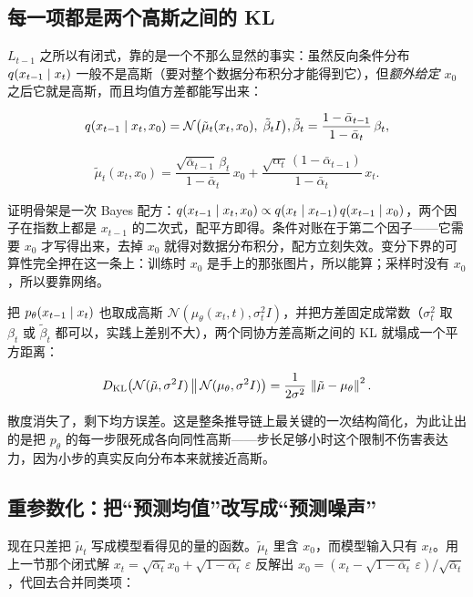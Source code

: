 \subsection{每一项都是两个高斯之间的 KL}

\(L_{t-1}\) 之所以有闭式，靠的是一个不那么显然的事实：虽然反向条件分布 \(q(x_{t-1}\mid x_t)\) 一般不是高斯（要对整个数据分布积分才能得到它），但\emph{额外给定 \(x_0\)} 之后它就是高斯，而且均值方差都能写出来：

\[
q(x_{t-1}\mid x_t,x_0) = \mathcal N\bigl(\tilde\mu_t(x_t,x_0),\;\tilde\beta_t I\bigr),
\space
\tilde\beta_t = \frac{1-\bar\alpha_{t-1}}{1-\bar\alpha_t}\,\beta_t,
\]

\[
\tilde\mu_t(x_t,x_0)
= \frac{\sqrt{\bar\alpha_{t-1}}\,\beta_t}{1-\bar\alpha_t}\,x_0
+ \frac{\sqrt{\alpha_t}\,(1-\bar\alpha_{t-1})}{1-\bar\alpha_t}\,x_t .
\]

证明骨架是一次 Bayes 配方：\(q(x_{t-1}\mid x_t,x_0)\propto q(x_t\mid x_{t-1})\,q(x_{t-1}\mid x_0)\)，两个因子在指数上都是 \(x_{t-1}\) 的二次式，配平方即得。条件对账在于第二个因子——它需要 \(x_0\) 才写得出来，去掉 \(x_0\) 就得对数据分布积分，配方立刻失效。变分下界的可算性完全押在这一条上：训练时 \(x_0\) 是手上的那张图片，所以能算；采样时没有 \(x_0\)，所以要靠网络。

把 \(p_\theta(x_{t-1}\mid x_t)\) 也取成高斯 \(\mathcal N(\mu_\theta(x_t,t),\sigma_t^2 I)\)，并把方差固定成常数（\(\sigma_t^2\) 取 \(\beta_t\) 或 \(\tilde\beta_t\) 都可以，实践上差别不大），两个同协方差高斯之间的 KL 就塌成一个平方距离：

\[
D_{\mathrm{KL}}\bigl(\mathcal N(\tilde\mu,\sigma^2 I)\,\big\|\,\mathcal N(\mu_\theta,\sigma^2 I)\bigr)
= \frac{1}{2\sigma^2}\,\left\lVert\tilde\mu-\mu_\theta\right\rVert^2 .
\]

散度消失了，剩下均方误差。这是整条推导链上最关键的一次结构简化，为此让出的是把 \(p_\theta\) 的每一步限死成各向同性高斯——步长足够小时这个限制不伤害表达力，因为小步的真实反向分布本来就接近高斯。

\subsection{重参数化：把``预测均值''改写成``预测噪声''}

现在只差把 \(\tilde\mu_t\) 写成模型看得见的量的函数。\(\tilde\mu_t\) 里含 \(x_0\)，而模型输入只有 \(x_t\)。用上一节那个闭式解 \(x_t=\sqrt{\bar\alpha_t}x_0+\sqrt{1-\bar\alpha_t}\,\varepsilon\) 反解出 \(x_0=(x_t-\sqrt{1-\bar\alpha_t}\,\varepsilon)/\sqrt{\bar\alpha_t}\)，代回去合并同类项：


